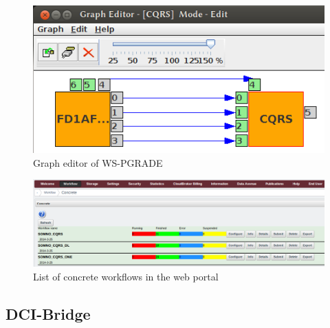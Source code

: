 \begin{figure}%
                \centering
                \includegraphics[width=1.0\columnwidth]{images/graph-editor.png}
                \caption{Graph editor of WS-PGRADE}
                \label{fig:grapheditor}
\end{figure}

\begin{figure}%
                \centering
                \includegraphics[width=2.0\columnwidth]{images/interface-workflows.png}
                \caption{List of concrete workflows in the web portal}
                \label{fig:interfaceworkflows}
\end{figure}


\subsection{DCI-Bridge}\label{dci}

